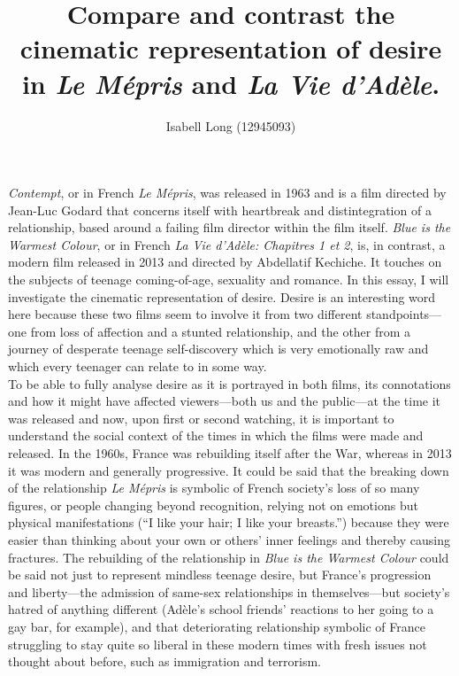\documentclass[12pt,a4paper]{article}
\begin{document}
\title{Compare and contrast the cinematic representation of desire in
       \textsl{Le Mépris} and \textsl{La Vie d’Adèle}.}
\author{Isabell Long (12945093)}
\maketitle

\textit{Contempt}, or in French \textit{Le Mépris}, was released in
1963 and is a film directed by Jean-Luc Godard that concerns itself
with heartbreak and distintegration of a relationship, based around a
failing film director within the film itself. \textit{Blue is the
Warmest Colour}, or in French \textit{La Vie d'Adèle: Chapitres 1 et
2}, is, in contrast, a modern film released in 2013 and directed by
Abdellatif Kechiche. It touches on the subjects of teenage
coming-of-age, sexuality and romance. In this essay, I will
investigate the cinematic representation of desire. Desire is an
interesting word here because these two films seem to involve it from
two different standpoints---one from loss of affection and a stunted
relationship, and the other from a journey of desperate teenage
self-discovery which is very emotionally raw and which every teenager
can relate to in some way.\\

To be able to fully analyse desire as it is portrayed in both films,
its connotations and how it might have affected viewers---both us and
the public---at the time it was released and now, upon first or second
watching, it is important to understand the social context of the
times in which the films were made and released. In the 1960s, France
was rebuilding itself after the War, whereas in 2013 it was modern and
generally progressive. It could be said that the breaking down of the
relationship \textit{Le Mépris} is symbolic of French society's loss
of so many figures, or people changing beyond recognition, relying not
on emotions but physical manifestations (``I like your hair; I like
your breasts.'') because they were easier than thinking about your own
or others' inner feelings and thereby causing fractures. The
rebuilding of the relationship in \textit{Blue is the Warmest Colour}
could be said not just to represent mindless teenage desire, but
France's progression and liberty---the admission of same-sex
relationships in themselves---but society's hatred of anything
different (Adèle's school friends' reactions to her going to a gay
bar, for example), and that deteriorating relationship symbolic of
France struggling to stay quite so liberal in these modern times with
fresh issues not thought about before, such as immigration and
terrorism.\\
\end{document}
